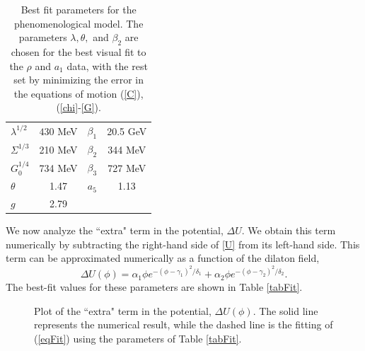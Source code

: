 \documentclass[12pt]{article}
\newcommand{\be}{\begin{equation}}
\newcommand{\ee}{\end{equation}}
\begin{document}
\begin{table}[htb]
\begin{center}
\begin{tabular}{| l | c || c | c | }
\hline
  $\lambda^{1/2}$ & $430$ MeV & $\beta_1$ & 20.5 GeV  \\
  $\Sigma^{1/3}$ &  210 MeV & $\beta_2$ & 344 MeV \\
  $G_0^{1/4}$ & 734 MeV & $\beta_3$ & 727 MeV \\
 $ \theta $& 1.47 &  $a_5$ & 1.13 \\
  $g $& 2.79 & & \\
  \hline
\end{tabular}
\caption{Best fit parameters for the phenomenological model. 
The parameters $\lambda, \theta,$ and $ \beta_2$ are chosen for the best visual fit to the $\rho$ and $a_1$ data, with the rest set by minimizing the error in the equations of motion (\ref{C}), (\ref{chi}-\ref{G}). }
\label{tabParam}
\end{center}
\end{table}


We now analyze the ``extra" term in the potential, $\Delta U$. 
We obtain this term numerically by subtracting the right-hand side of \ref{U} from its left-hand side.
This term can be approximated numerically as a function of the dilaton field, 
\be
\Delta U\left(\phi\right) = \alpha_1 \phi e^{-\left(\phi-\gamma_1\right)^2/\delta_1 } +   \alpha_2 \phi e^{-\left(\phi-\gamma_2\right)^2/\delta_2 } .
\label{eqFit}
\ee
The best-fit values for these parameters are shown in Table \ref{tabFit}.

\begin{figure}[htb]
\caption{Plot of the ``extra" term in the potential, $\Delta U(\phi)$. The solid line represents the numerical result, while the dashed line is the fitting of (\ref{eqFit}) using the parameters of Table \ref{tabFit}.}
\label{figdeltaU}
\end{figure}
\end{document}
